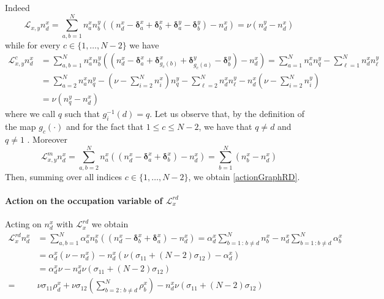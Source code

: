 \documentclass[11pt]{article}
\numberwithin{equation}{section}
\numberwithin{equation}{subsection}
\begin{document}
Indeed
\begin{equation}
	\mathcal{L}_{x,y}n_{d}^{x}=\sum_{a,b=1}^{N}n_{a}^{x}n_{b}^{y}\left((n_{d}^{x}-\bm{\delta}_{a}^{x}+\bm{\delta}_{b}^{x}+\bm{\delta}_{a}^{y}-\bm{\delta}_{b}^{y})-n_{d}^{x}\right)=\nu\left(n_{d}^{y}-n_{d}^{x}\right)
\end{equation}
while for every $c\in \{1,\ldots,N-2\}$ we have 
\begin{equation}
	\begin{split}
		\mathcal{L}_{x,y}^{c}n_{d}^{x}&=\sum_{a,b=1}^{N}n_{a}^{x}n_{b}^{y}\left((n_{d}^{x}-\bm{\delta}_{a}^{x}+\bm{\delta}_{g_{c}(b)}^{x}+\bm{\delta}_{g_{c}(a)}^{y}-\bm{\delta}_{b}^{y})-n_{d}^{x}\right)=\sum_{a=1}^{N}n_{a}^{x}n_{q}^{y}-\sum_{\ell=1}^{N}n_{d}^{x}n_{\ell}^{y}
		\\&=
		\sum_{a=2}^{N}n_{a}^{x}n_{q}^{y}-\left(\nu-\sum_{i=2}^{N}n_{i}^{x}\right)n_{q}^{y}-\sum_{\ell=2}^{N}n_{d}^{x}n_{\ell}^{y}-n_{d}^{x}\left(\nu-\sum_{i=2}^{N}n_{i}^{y}\right)
		\\&=
		\nu(n_{q}^{y}-n_{d}^{x})
	\end{split}
\end{equation}
where we call $q$ such that $g_{i}^{-1}(d)=q$. Let us observe that, by the definition of the map $g_{c}(\cdot)$ and for the fact that $1\leq c\leq N-2$, we have that $q\neq d$ and $q\neq 1$ .
Moreover
\begin{equation}
	\mathcal{L}_{x,y}^{m}n_{d}^{x}=\sum_{a,b=2}^{N}n_{a}^{x}\left((n_{d}^{x}-\bm{\delta}_{a}^{x}+\bm{\delta}_{b}^{x})-n_{d}^{x}\right)=\sum_{b=1}^{N}(n_{b}^{x}-n_{d}^{x})
\end{equation}
Then, summing over all indices $c\in\{1,\ldots,N-2\}$, we obtain \eqref{actionGraphRD}.
\paragraph{Action on the occupation variable of $\mathcal{L}_{x}^{rd}$}
Acting on $n_{d}^{x}$  with $\mathcal{L}_{x}^{rd}$ we obtain
\begin{equation}\label{actionBoudaryRD}
	\begin{split}
		\mathcal{L}_{x}^{rd}n_{d}^{x}&=\sum_{a,b=1}^{N}\alpha_{a}^{x}n_{b}^{x}\left((n_{d}^{x}-\bm{\delta}_{b}^{x}+\bm{\delta}_{a}^{x})-n_{d}^{x}\right)=\alpha_{d}^{x}\sum_{b=1\,:\,b\neq d}^{N}n_{b}^{x}-n_{d}^{x}\sum_{b=1\,:b\neq d}^{N}\alpha_{b}^{x}
		\\&=
		\alpha_{d}^{x}\left(\nu-n_{d}^{x}\right)-n_{d}^{x}\left(\nu(\sigma_{11}+(N-2)\sigma_{12})-\alpha_{d}^{x}\right)
		\\&=\alpha_{d}^{x}\nu-n_{d}^{x}\nu(\sigma_{11}+(N-2)\sigma_{12})
		\\=&
		\nu\sigma_{11}\rho_{d}^{x}+\nu\sigma_{12}\left(\sum_{b=2\,:\,b\neq d}^{N}\rho_{b}^{x}\right)-n_{d}^{x}\nu(\sigma_{11}+(N-2)\sigma_{12})
	\end{split}
\end{equation}
\end{document}
